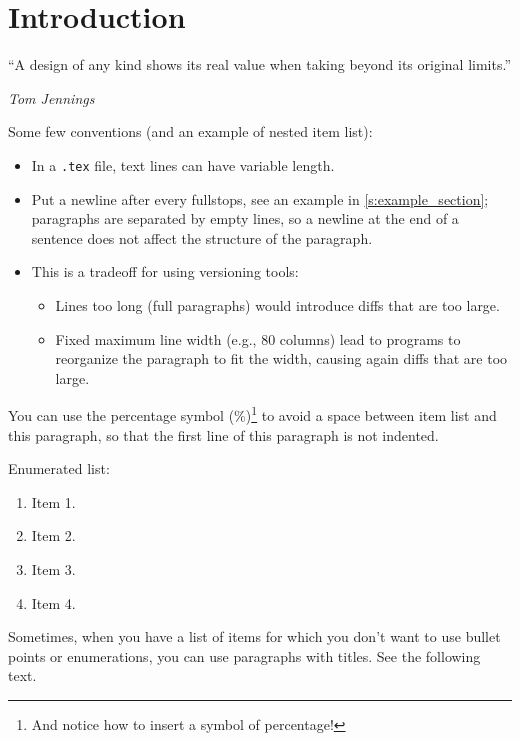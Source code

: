 \chapter{Introduction}
\label{c:intro}

%
%

\epigraph{\enquote{A design of any kind shows its real value when taking beyond its original limits.}}{\emph{Tom Jennings}}

Some few conventions (and an example of nested item list):

\begin{itemize}
\item In a \texttt{.tex} file, text lines can have variable length.
\item Put a newline after every fullstops, see an example in \cref{s:example_section}; paragraphs are separated by empty lines, so a newline at the end of a sentence does not affect the structure of the paragraph.
\item This is a tradeoff for using versioning tools:
\begin{itemize}
\item Lines too long (full paragraphs) would introduce diffs that are too large.
\item Fixed maximum line width (e.g., $80$ columns) lead to programs to reorganize the paragraph to fit the width, causing again diffs that are too large.
\end{itemize}
\end{itemize}
%
You can use the percentage symbol (\%)\footnote{And notice how to insert a symbol of percentage!} to avoid a space between item list and this paragraph, so that the first line of this paragraph is not indented.

Enumerated list:

\begin{enumerate}
\item Item 1.
\item Item 2.
\item Item 3.
\item Item 4.
\end{enumerate}

Sometimes, when you have a list of items for which you don't want to use bullet points or enumerations, you can use paragraphs with titles.
See the following text.

